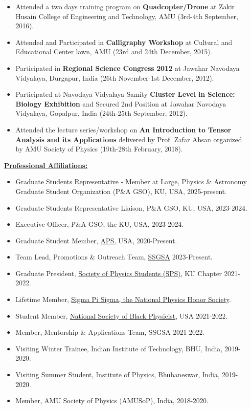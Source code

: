 \documentclass[10pt]{report}
\begin{document}
\begin{itemize}
\item Attended a two days training program on \textbf{Quadcopter/Drone} at Zakir Husain College of Engineering and Technology, AMU (3rd-4th September, 2016).
\item Attended and Participated in \textbf{Calligraphy Workshop} at Cultural and Educational Center lawn, AMU (23rd and 24th December, 2015).
\item Participated in \textbf{Regional Science Congress 2012} at Jawahar Navodaya Vidyalaya, Durgapur, India (26th November-1st December, 2012).
\item Participated at Navodaya Vidyalaya Samity \textbf{Cluster Level in Science: Biology Exhibition} and Secured 2nd Position at Jawahar Navodaya Vidyalaya, Gopalpur, India (24th-25th September, 2012).
\item Attended the lecture series/workshop on \textbf{An Introduction to Tensor Analysis and its Applications} delivered by Prof. Zafar Ahsan organized by AMU Society of Physics (19th-28th February, 2018).
\end{itemize}\vspace{2mm}\begin{large}\textbf{\underline{Professional Affiliations:}}\end{large}
\begin{itemize}
\item Graduate Students Representative - Member at Large, Physics \& Astronomy Graduate Student Organization (P\&A GSO), KU, USA, 2025-present.
\item Graduate Students Representative Liaison, P\&A GSO, KU, USA, 2023-2024.
\item Executive Officer, P\&A GSO, the KU, USA, 2023-2024.
\item Graduate Student Member, \href{https://www.aps.org}{APS}, USA, 2020-Present.
\item Team Lead, Promotions \& Outreach Team, \href{https://ssgsa.us/about#Members}{SSGSA} 2023-Present.
\item Graduate President, \href{https://www.spsnational.org}{Society of Physics Students (SPS)}, KU Chapter 2021-2022.
\item Lifetime Member, \href{https://www.sigmapisigma.org/sigmapisigma}{Sigma Pi Sigma, the National Physics Honor Society}.
\item Student Member, \href{https://nsbp.org}{National Society of Black Physicist}, USA 2021-2022.
\item Member, Mentorship \& Applications Team, SSGSA 2021-2022.
\item Visiting Winter Trainee, Indian Institute of Technology, BHU, India, 2019-2020.
\item Visiting Summer Student, Institute of Physics, Bhubaneswar, India, 2019-2020.
\item Member, AMU Society of Physics (AMUSoP), India, 2018-2020.
\end{itemize}
\end{document}
